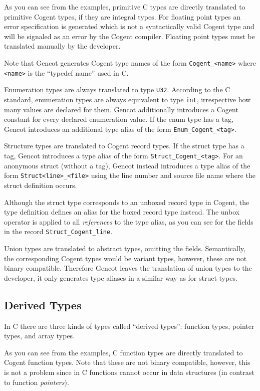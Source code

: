 \documentclass[a4paper]{report}
\newcommand{\code}[1]{\textnormal{\texttt{#1}}}
\begin{document}
As you can see from the examples, primitive C types are directly translated to primitive Cogent types, if they are
integral types. For floating point types an error specification is generated which is not a syntactically valid 
Cogent type and will be signaled as an error by the Cogent compiler. Floating point types must be translated manually
by the developer.

Note that Gencot generates Cogent type names of the form \code{Cogent\_<name>} where \code{<name>} is the ``typedef
name'' used in C. 

Enumeration types are always translated to type \code{U32}. According to the C standard, enumeration types are always
equivalent to type \code{int}, irrespective how many values are declared for them. Gencot additionally introduces
a Cogent constant for every declared enumeration value. If the enum type has a tag, Gencot introduces an additional
type alias of the form \code{Enum\_Cogent\_<tag>}.

Structure types are translated to Cogent record types. If the struct type has a tag, Gencot introduces a type alias
of the form \code{Struct\_Cogent\_<tag>}. For an anonymous struct (without a tag), Gencot instead introduces a type alias
of the form \code{Struct<line>\_<file>} using the line number and source file name where the struct definition occurs.

Although the struct type corresponds to an unboxed record type in Cogent, the type definition defines an alias for the 
boxed record type instead. The unbox operator is applied to all \textit{references} to the type alias, as you can see 
for the fields in the record \code{Struct\_Cogent\_line}.

Union types are translated to abstract types, omitting the fields. Semantically, the corresponding Cogent types would
be variant types, however, these are not binary compatible. Therefore Gencot leaves the translation of union types to
the developer, it only generates type aliases in a similar way as for struct types.

\subsection{Derived Types}
\label{types-auto-derived}

In C there are three kinds of types called ``derived types'': function types, pointer types, and array types.

As you can see from the examples, C function types are directly translated to Cogent function types. Note that these
are not binary compatible, however, this is not a problem since in C functions cannot occur in data structures (in
contrast to function \textit{pointers}).
\end{document}
